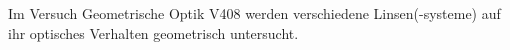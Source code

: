 Im Versuch Geometrische Optik V408 werden verschiedene Linsen(-systeme) auf ihr optisches Verhalten geometrisch untersucht.
